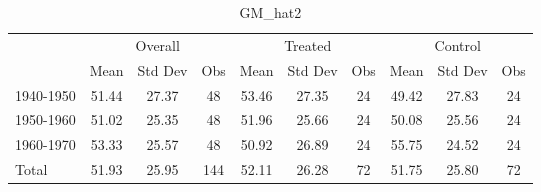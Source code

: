 \begin{table}[htbp]\centering
\def\sym#1{\ifmmode^{#1}\else\(^{#1}\)\fi}
\caption{GM\_hat2 \label{tab1}}
\begin{tabular}{l*{3}{ccc}}
\toprule
                    &\multicolumn{3}{c}{Overall}           &\multicolumn{3}{c}{Treated}           &\multicolumn{3}{c}{Control}           \\
                    &        Mean&     Std Dev&         Obs&        Mean&     Std Dev&         Obs&        Mean&     Std Dev&         Obs\\
\midrule
1940-1950           &       51.44&       27.37&          48&       53.46&       27.35&          24&       49.42&       27.83&          24\\
1950-1960           &       51.02&       25.35&          48&       51.96&       25.66&          24&       50.08&       25.56&          24\\
1960-1970           &       53.33&       25.57&          48&       50.92&       26.89&          24&       55.75&       24.52&          24\\
Total               &       51.93&       25.95&         144&       52.11&       26.28&          72&       51.75&       25.80&          72\\
\bottomrule
\end{tabular}
\end{table}

